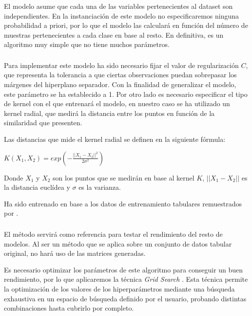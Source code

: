             El modelo  asume que cada una de las variables pertenecientes al dataset son independientes. En la instanciación de este modelo no especificaremos ninguna probabilidad a priori, por lo que el modelo las calculará en función del número de muestras pertenecientes a cada clase en base al resto. En definitiva, es un algoritmo muy simple que no tiene muchos parámetros.


        \subsubsection{}

            Para implementar este modelo ha sido necesario fijar el valor de regularización $C$, que representa la tolerancia a que ciertas observaciones puedan sobrepasar los márgenes del hiperplano separador. Con la finalidad de generalizar el modelo, este parámetro se ha establecido a 1. Por otro lado es necesario especificar el tipo de kernel con el que entrenará el modelo, en nuestro caso se ha utilizado un kernel radial, que medirá la distancia entre los puntos en función de la similaridad que presenten.

            Las distancias que mide el kernel radial se definen en la siguiente fórmula:

            \begin{center}
                $K(X_1, X_2) = exp (- \frac{||X_1 - X_2||^2}{2 \sigma^2})$
            \end{center}

            Donde $X_1$ y $X_2$ son los puntos que se medirán en base al kernel $K$, $||X_1 - X_2||$ es la distancia euclídea y $\sigma$ es la varianza.

             Ha sido entrenado en base a los datos de entrenamiento tabulares remuestrados por .

        \subsubsection{}

            El método  servirá como referencia para testar el rendimiento del resto de modelos. Al ser un método que se aplica sobre un conjunto de datos tabular original, no hará uso de las matrices generadas.

            Es necesario optimizar los parámetros de este algoritmo para conseguir un buen rendimiento, por lo que aplicaremos la técnica \textit{Grid Search} \cite{GridSearchSklearnLibrary}. Esta técnica permite la optimización de los valores de los hiperparámetros mediante una búsqueda exhaustiva en un espacio de búsqueda definido por el usuario, probando distintas combinaciones hasta cubrirlo por completo. 


